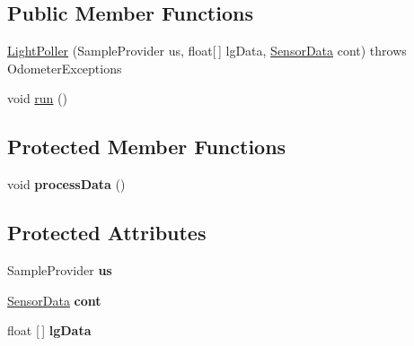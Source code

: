 \subsection*{Public Member Functions}
\begin{DoxyCompactItemize}
\item 
\hyperlink{classca_1_1mcgill_1_1ecse211_1_1sensors_1_1_light_poller_aa284d0f6d7e032d3610a7ad428f16132}{Light\+Poller} (Sample\+Provider us, float\mbox{[}$\,$\mbox{]} lg\+Data, \hyperlink{classca_1_1mcgill_1_1ecse211_1_1sensors_1_1_sensor_data}{Sensor\+Data} cont)  throws Odometer\+Exceptions 
\item 
void \hyperlink{classca_1_1mcgill_1_1ecse211_1_1sensors_1_1_light_poller_a31751b40132d9402de493aa9ec11d9d5}{run} ()
\end{DoxyCompactItemize}
\subsection*{Protected Member Functions}
\begin{DoxyCompactItemize}
\item 
\mbox{\label{classca_1_1mcgill_1_1ecse211_1_1sensors_1_1_light_poller_af7c5e71f9ef2c6bebd4a67ba6b533f28}} 
void {\bfseries process\+Data} ()
\end{DoxyCompactItemize}
\subsection*{Protected Attributes}
\begin{DoxyCompactItemize}
\item 
\mbox{\label{classca_1_1mcgill_1_1ecse211_1_1sensors_1_1_light_poller_a697ac7826ad649b453cf9cdd1b5f723b}} 
Sample\+Provider {\bfseries us}
\item 
\mbox{\label{classca_1_1mcgill_1_1ecse211_1_1sensors_1_1_light_poller_a2c208445d4fb1feedd269c0fda447d6f}} 
\hyperlink{classca_1_1mcgill_1_1ecse211_1_1sensors_1_1_sensor_data}{Sensor\+Data} {\bfseries cont}
\item 
\mbox{\label{classca_1_1mcgill_1_1ecse211_1_1sensors_1_1_light_poller_af014631d513b89ba9a55f0e7d0e8d754}} 
float \mbox{[}$\,$\mbox{]} {\bfseries lg\+Data}
\end{DoxyCompactItemize}


